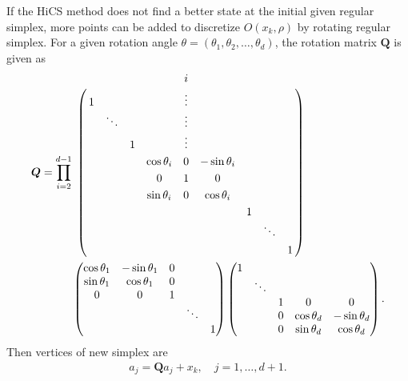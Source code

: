 \documentclass[final,1p,times]{elsarticle}
\begin{document}
If the HiCS method does not find a better state at the initial given regular
simplex, more points can be added to discretize $O(x_k, \rho)$ by 
rotating regular simplex.
For a given rotation angle
$\theta=(\theta_1,\theta_2,\dots,\theta_{d})$, the
rotation matrix $\bm Q$ is given as 
\begin{equation}
\begin{aligned}
	{\bm Q} = 
	 \prod_{i=2}^{d-1} &
\bordermatrix{
  &  &       &  & 		   & i &		   &  &  & \cr
  & 1&       &  & 		   & \vdots  & 		   &  &  &  \cr
  &  & \ddots&  & 		   & \vdots  & 		   &  &  &  \cr
  &  &       & 1&          & \vdots  & 		   &  &  &  \cr
  &  &       &  & \cos \theta_i & 0 & -\sin \theta_i &  &  &  \cr
  &  &       &  &   0	 & 1 &     0     &  &  & \cr 
  &  &       &  & \sin \theta_i & 0 &  \cos \theta_i &  &  &  \cr
  &  &       &  &          &   &           & 1 & &  \cr
  &  &       &  &          &   &           &  & \ddots &   \cr
  &  &       &  &          &   &           &  &  & 1 
}
\\
	& \begin{pmatrix}
  \cos \theta_1 & -\sin \theta_1 & 0 &  		&   \\
  \sin \theta_1 & \cos \theta_1  & 0 & 	 	& 	\\
  	0	   &      0    & 1 & 		&   \\
  		   & 		   &   & \ddots &   \\
  		   & 		   &   &   		& 1 
	\end{pmatrix}
	\begin{pmatrix}
  1 &  &  &  		&   \\
    & \ddots  &  & 	 	& 	\\
    &    & 1 & 	0	& 0  \\
    &    & 0 & \cos\theta_d & -\sin\theta_d  \\
    & 	 & 0 &  \sin\theta_d & \cos\theta_d 
	\end{pmatrix}.
\end{aligned}
	\label{}
\end{equation}
Then vertices of new simplex are
\begin{align}
	a_j = \bm{Q}a_j + x_k, \quad j = 1,\dots, d+1.
	\label{}
\end{align}
\end{document}
